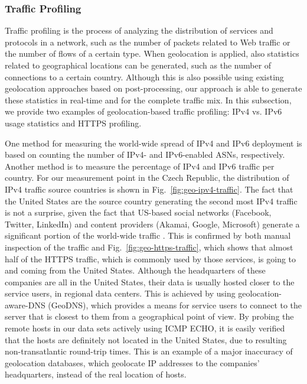 \subsubsection{Traffic Profiling}

Traffic profiling is the process of analyzing the distribution of services and protocols in a network, such as the number of packets related to Web traffic or the number of flows of a certain type. When geolocation is applied, also statistics related to geographical locations can be generated, such as the number of connections to a certain country. Although this is also possible using existing geolocation approaches based on post-processing, our approach is able to generate these statistics in real-time and for the complete traffic mix. In this subsection, we provide two examples of geolocation-based traffic profiling: IPv4 vs. IPv6 usage statistics and HTTPS profiling.

One method for measuring the world-wide spread of IPv4 and IPv6 deployment is based on counting the number of IPv4- and IPv6-enabled ASNs, respectively. Another method is to measure the percentage of IPv4 and IPv6 traffic per country. For our measurement point in the Czech Republic, the distribution of IPv4 traffic source countries is shown in Fig.~\ref{fig:geo-ipv4-traffic}. The fact that the United States are the source country generating the second most IPv4 traffic is not a surprise, given the fact that US-based social networks (Facebook, Twitter, LinkedIn) and content providers (Akamai, Google, Microsoft) generate a significant portion of the world-wide traffic \cite{Gehlen-2012-Uncovering}. This is confirmed by both manual inspection of the traffic and Fig.~\ref{fig:geo-https-traffic}, which shows that almost half of the HTTPS traffic, which is commonly used by those services, is going to and coming from the United States. Although the headquarters of these companies are all in the United States, their data is usually hosted closer to the service users, in regional data centers. This is achieved by using geolocation-aware-DNS (GeoDNS), which provides a means for service users to connect to the server that is closest to them from a geographical point of view. By probing the remote hosts in our data sets actively using ICMP ECHO, it is easily verified that the hosts are definitely not located in the United States, due to resulting non-transatlantic round-trip times. This is an example of a major inaccuracy of geolocation databases, which geolocate IP addresses to the companies' headquarters, instead of the real location of hosts.

